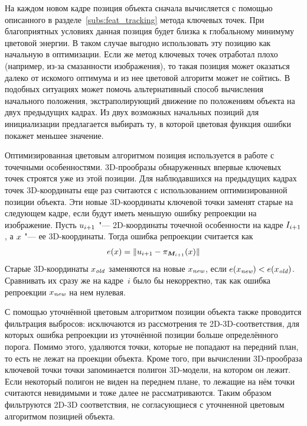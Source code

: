 На каждом новом кадре позиция объекта сначала вычисляется с помощью
описанного в разделе~\ref{subs:feat_tracking} метода ключевых точек.
При благоприятных условиях данная позиция будет близка к глобальному минимуму
цветовой энергии.
В таком случае выгодно использовать эту позицию как начальную в оптимизации.
Если же метод ключевых точек отработал плохо (например, из-за смазанности
изображения), то такая позиция может оказаться далеко от искомого оптимума и
из нее цветовой алгоритм может не сойтись.
В подобных ситуациях может помочь альтернативный способ вычисления начального
положения, экстраполирующий движение по положениям объекта на двух предыдущих
кадрах.
Из двух возможных начальных позиций для инициализации предлагается выбирать ту,
в которой цветовая функция ошибки покажет меньшее значение.

Оптимизированная цветовым алгоритмом позиция используется в работе с точечными
особенностями.
3D-прообразы обнаруженных впервые ключевых точек строятся уже из этой позиции.
Для наблюдавшихся на предыдущих кадрах точек 3D-координаты еще раз считаются с
использованием оптимизированной позиции объекта.
Эти новые 3D-координаты ключевой точки заменят старые на следующем кадре, если
будут иметь меньшую ошибку репроекции на изображение.
Пусть $\mathnormal{u}_{i + 1}$ "--- 2D-координаты точечной особенности на кадре
$I_{i + 1}$, а $\mathnormal{x}$ "--- ее 3D-координаты.
Тогда ошибка репроекции считается как
\begin{equation}\label{eqn:err_reproj}
    \mathnormal{e}( \mathnormal{x} ) = \| \mathnormal{u}_{i + 1} - \pi_{\bm{M}_{i + 1}}(\mathnormal{x}) \|
\end{equation}
Старые 3D-координаты $\mathnormal{x}_{\text {\it old}}$ заменяются на новые $\mathnormal{x}_{\text{\it new}}$, если
$\mathnormal{e}( \mathnormal{x}_{\text{\it new}} ) < \mathnormal{e}( \mathnormal{x}_{\text {\it old}} )$.
Сравнивать их сразу же на кадре~$i$ было бы некорректно, так как ошибка
репроекции $\mathnormal{x}_{\text{\it new}}$ на нем нулевая.

С помощью уточнённой цветовым алгоритмом позиции объекта также проводится
фильтрация выбросов: исключаются из рассмотрения те 2D-3D-соответствия, для
которых ошибка репроекции из уточнённой позиции больше определённого порога.
Помимо этого, удаляются точки, которые не попадают на передний план, то есть не
лежат на проекции объекта.
Кроме того, при вычислении 3D-прообраза ключевой точки точки запоминается
полигон 3D-модели, на котором он лежит.
Если некоторый полигон не виден на переднем плане, то лежащие на нём точки
считаются невидимыми и тоже далее не рассматриваются.
Таким образом фильтруются 2D-3D соответствия, не согласующиеся с уточненной
цветовым алгоритмом позицией объекта.

